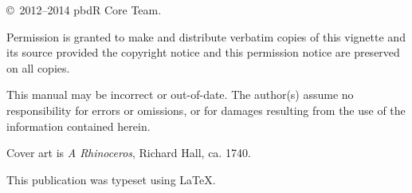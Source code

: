 \null
\vfill
\copyright\ 2012--2014 pbdR Core Team.

Permission is granted to make and distribute verbatim copies of
this vignette and its source provided the copyright notice and
this permission notice are preserved on all copies.

This manual may be incorrect or out-of-date.  The author(s) assume
no responsibility for errors or omissions, or for damages resulting
from the use of the information contained herein.

Cover art is \textit{A Rhinoceros}, Richard Hall, ca. 1740.

This publication was typeset using \LaTeX.
